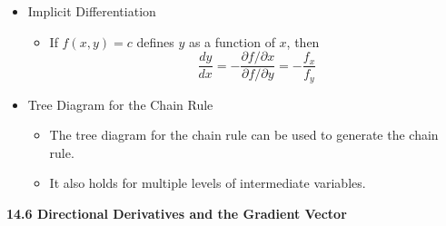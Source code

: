 \documentclass[12pt]{article}
\newcommand{\ds}{\displaystyle}
\newcommand{\<}{\left<}
\renewcommand{\>}{\right>}
\newcommand{\p}{\partial}
\begin{document}
\begin{itemize}
  \item Implicit Differentiation
    \begin{itemize}
    \item If $f(x,y)=c$ defines $y$ as a function of $x$, then
      \[\ds\frac{dy}{dx} = -\frac{\p f/\p x}{\p f/\p y} = -\frac{f_x}{f_y}\]
    \end{itemize}

  \item Tree Diagram for the Chain Rule
    \begin{itemize}
      \item The tree diagram for the chain rule can be used to generate the chain rule.
      \item It also holds for multiple levels of intermediate variables.
    \end{itemize}
    
  

\end{itemize}

\newpage

\centerline{\bf 14.6 Directional Derivatives and the Gradient Vector}
\end{document}
